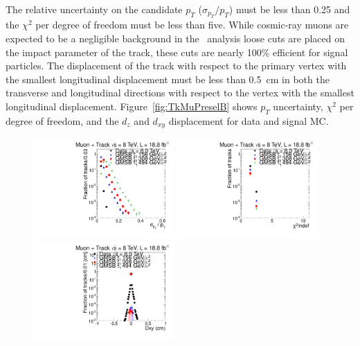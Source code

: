 The relative uncertainty on the candidate $p_T$ ($\sigma_{p_T}/p_T$) must be less than 0.25 and the $\chi^2$ per degree of freedom must be less than five.
While cosmic-ray muons are expected to be a negligible background in the \tktof\ analysis loose cuts are placed on the impact parameter of the track, 
these cuts are nearly 100\% efficient for signal particles.
The displacement of the track with respect to the primary vertex
with the smallest longitudinal displacement must be less than 0.5~cm in both the transverse and longitudinal directions with respect to the vertex with the smallest
longitudinal displacement.
Figure~\ref{fig:TkMuPreselB} shows $p_T$ uncertainty, $\chi^2$ per degree of freedom, and the $d_z$ and $d_{xy}$ displacement for data and signal MC.

\begin{figure}
\centering
  \includegraphics[clip=false, trim=0.0cm 0cm 0.0cm 0cm, width=0.48\textwidth]{figures/tkmu/Selection_Comp_8TeV_GMStau_Pterr_BS}
  \includegraphics[clip=false, trim=0.0cm 0cm 0.0cm 0cm, width=0.48\textwidth]{figures/tkmu/Selection_Comp_8TeV_GMStau_Chi2_BS} \\
  \includegraphics[clip=false, trim=0.0cm 0cm 0.0cm 0cm, width=0.48\textwidth]{figures/tkmu/Selection_Comp_8TeV_GMStau_Dxy_BS}

\end{figure}
